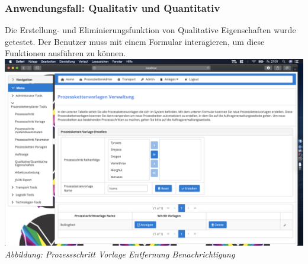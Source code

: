 \documentclass[enabledeprecatedfontcommands,fontsize=12pt,paper=a4,twoside]{scrartcl}
\begin{document}
\subsubsection{Anwendungsfall: Qualitativ und Quantitativ}
Die Erstellung- und Eliminierungsfunktion von Qualitative Eigenschaften wurde getestet. Der Benutzer muss mit einem Formular interagieren, um diese Funktionen ausführen zu können.\\
\hypertarget{sc3.3.3.7}{
\includegraphics[width=1\textwidth]{Screenshots/335Formular.png}
\textit{Abbildung: Prozessschritt Vorlage Entfernung Benachrichtigung}
}
\end{document}
